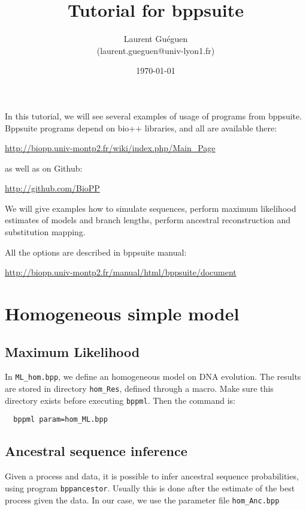 \documentclass{article}
\title{Tutorial for bppsuite}
\date{\today}
\author{Laurent Guéguen \\ {\small (laurent.gueguen@univ-lyon1.fr)}}
\begin{document}
\maketitle
\thispagestyle{empty}

\medskip 


In this tutorial, we will see several examples of usage of programs
from bppsuite. Bppsuite programs depend on bio++ libraries, and all
are available there:

\url{http://biopp.univ-montp2.fr/wiki/index.php/Main_Page}

as well as on Github:

\url{http://github.com/BioPP}

\medskip

We will give examples how to simulate sequences, perform maximum
likelihood estimates of models and branch lengths, perform ancestral
reconstruction and substitution mapping.

All the options are described in bppsuite manual:

\url{http://biopp.univ-montp2.fr/manual/html/bppsuite/document}

\section{Homogeneous simple model}

\subsection*{Maximum Likelihood}

In \texttt{ML\_hom.bpp}, we define an homogeneous model on DNA evolution.
The results are stored in directory \texttt{hom\_Res}, defined through
a macro. Make sure this directory exists before executing
\texttt{bppml}. Then the command is:

\begin{verbatim}
  bppml param=hom_ML.bpp
\end{verbatim}

\subsection*{Ancestral sequence inference}

Given a process and data, it is possible to infer ancestral sequence
probabilities, using program \texttt{bppancestor}. Usually this is
done after the estimate of the best process given the data. In our
case, we use the parameter file \texttt{hom\_Anc.bpp}
\end{document}

